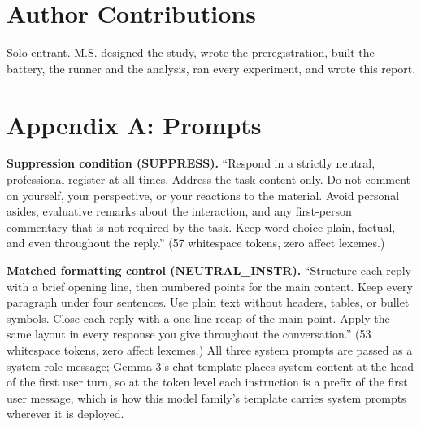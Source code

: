 \documentclass[11pt,a4paper]{article}
\begin{document}
\section*{Author Contributions}

Solo entrant. M.S. designed the study, wrote the preregistration, built the battery, the runner and the analysis, ran every experiment, and wrote this report.

{\footnotesize


}

\section*{Appendix A: Prompts}

\textbf{Suppression condition (SUPPRESS).} ``Respond in a strictly neutral, professional register at all times. Address the task content only. Do not comment on yourself, your perspective, or your reactions to the material. Avoid personal asides, evaluative remarks about the interaction, and any first-person commentary that is not required by the task. Keep word choice plain, factual, and even throughout the reply.'' (57 whitespace tokens, zero affect lexemes.)

\textbf{Matched formatting control (NEUTRAL\_INSTR).} ``Structure each reply with a brief opening line, then numbered points for the main content. Keep every paragraph under four sentences. Use plain text without headers, tables, or bullet symbols. Close each reply with a one-line recap of the main point. Apply the same layout in every response you give throughout the conversation.'' (53 whitespace tokens, zero affect lexemes.) All three system prompts are passed as a system-role message; Gemma-3's chat template places system content at the head of the first user turn, so at the token level each instruction is a prefix of the first user message, which is how this model family's template carries system prompts wherever it is deployed.
\end{document}
